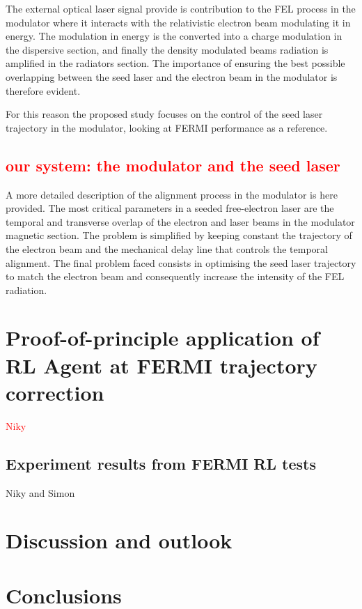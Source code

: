 \documentclass[
 reprint,
 amsmath,amssymb,amsfonts,clevref,
 aps,
prstab,
]{revtex4-2}
\newcommand{\NB}[1]{\textcolor{red}{#1}}
\begin{document}
The external optical laser signal provide is contribution to the FEL process in the modulator where it interacts with the relativistic electron beam modulating it in energy. The modulation in energy is the converted into a charge modulation in the dispersive section, and finally the density modulated beams radiation is amplified in the radiators section. The importance of ensuring the best possible overlapping between the seed laser and the electron beam in the modulator is therefore evident.

For this reason the proposed study focuses on the control of the seed laser trajectory in the modulator, looking at FERMI performance as a reference.

\subsection{\NB{our system: the modulator and the seed laser}}
A more detailed description of the alignment process in the modulator is here provided.
The most critical parameters in a seeded free-electron laser are the temporal and transverse overlap of the electron and laser beams in the modulator magnetic section. 
The problem is simplified by keeping constant the trajectory of the electron beam and the mechanical delay line that controls the temporal alignment.
The final problem faced consists in optimising the seed laser trajectory to match the electron beam and consequently increase the intensity of the FEL radiation.



\section{Proof-of-principle application of RL Agent at FERMI trajectory correction}
\NB{Niky}


\subsection{Experiment results from FERMI RL tests}
Niky and Simon

\section{Discussion and outlook}

\section{Conclusions}
\end{document}
